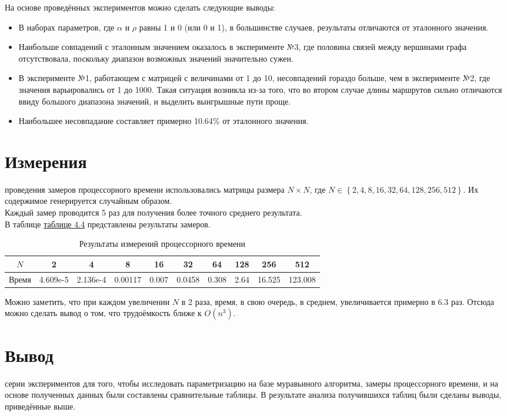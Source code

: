 На основе проведённых экспериментов можно сделать следующие выводы:
\begin{itemize}
	\item В наборах параметров, где $\alpha$ и $\rho$ равны 1 и 0 (или 0 и 1), в большинстве случаев, результаты отличаются от эталонного значения.
	\item Наибольше совпадений с эталонным значением оказалось в эксперименте №3, где половина связей между вершинами графа отсутствовала, поскольку диапазон возможных значений значительно сужен.
	\item В эксперименте №1, работающем с матрицей с величинами от 1 до 10, несовпадений гораздо больше, чем в эксперименте №2, где значения варьировались от 1 до 1000. Такая ситуация возникла из-за того, что во втором случае длины маршрутов сильно отличаются ввиду большого диапазона значений, и выделить выигрышные пути проще.
	\item Наибольшее несовпадание составляет примерно 10.64\% от эталонного значения.
\end{itemize}

\section{Измерения}
 проведения замеров процессорного времени использовались матрицы размера $N \times N$, где $N \in \left\lbrace 2, 4, 8, 16, 32, 64, 128, 256, 512 \right\rbrace$.
Их содержимое генерируется случайным образом.\\ 

Каждый замер проводится 5 раз для получения более точного среднего результата. \\

В таблице \hyperref[table_time]{таблице 4.4} представлены результаты замеров.

\begin{table}[ph] \label{table_time}
	\caption{Результаты измерений процессорного времени}
	\centering
	\begin{tabular}{|c|c|c|c|c|c|c|c|c|c|}
		\hline
		$N$ &2 &4 &8 &16 &32 &64 &128 &256 &512\\
		\hline
		Время    &4.609e-5 &2.136e-4 &0.00117 &0.007 &0.0458 &0.308 &2.64 &16.525 &123.008\\
		\hline
	\end{tabular}
\end{table}

Можно заметить, что при каждом увеличении $N$ в 2 раза, время, в свою очередь, в среднем, увеличивается примерно в 6.3 раз. Отсюда можно сделать вывод о том, что трудоёмкость ближе к $O(n^3)$.

\section*{Вывод}
 серии экспериментов для того, чтобы исследовать параметризацию на базе муравьиного алгоритма, замеры процессорного времени, и на основе полученных данных были составлены сравнительные таблицы. В результате анализа получившихся таблиц были сделаны выводы, приведённые выше.
